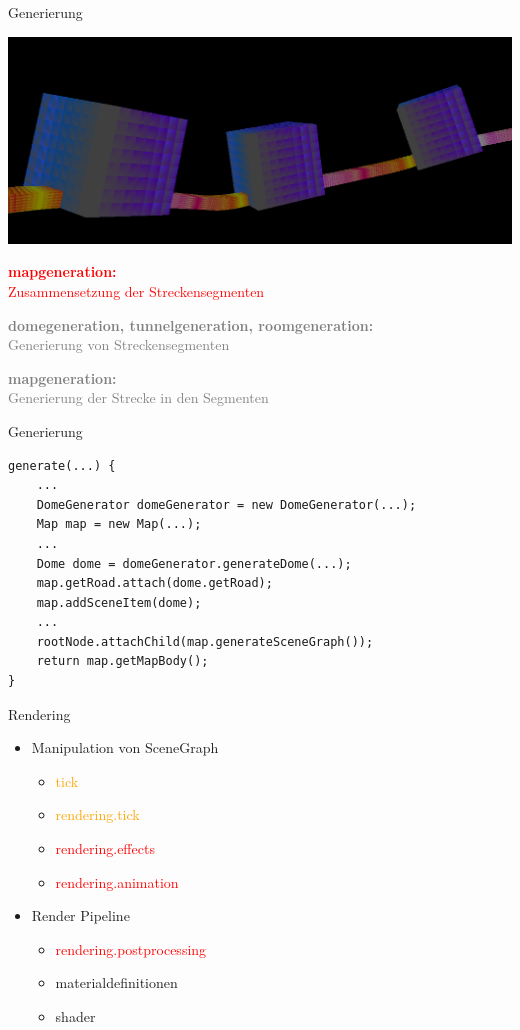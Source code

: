 \documentclass[10pt]{beamer}
\begin{document}
\begin{frame}[fragile]{Generierung}
    
    \includegraphics[width=.5\linewidth]{./Bilder/mapgenerationPrototype.PNG}
    \begin{itemize}
        \item \textcolor{red}{\textbf{mapgeneration:}\\Zusammensetzung der Streckensegmenten}\par
        \textcolor{gray}{\item \textbf{domegeneration, tunnelgeneration, roomgeneration:}\\Generierung von Streckensegmenten}\par
        \textcolor{gray}{\item \textbf{mapgeneration:}\\Generierung der Strecke in den Segmenten}
    \end{itemize}
\end{frame}



\begin{frame}[fragile]{Generierung}
    \begin{lstlisting}
generate(...) {
    ...
    DomeGenerator domeGenerator = new DomeGenerator(...);
    Map map = new Map(...);
    ...
    Dome dome = domeGenerator.generateDome(...);
    map.getRoad.attach(dome.getRoad);
    map.addSceneItem(dome);
    ...
    rootNode.attachChild(map.generateSceneGraph());
    return map.getMapBody();
}
    \end{lstlisting}
\end{frame}




\begin{frame}[fragile]{Rendering}
    \begin{itemize}
        \item Manipulation von SceneGraph
        \begin{itemize}
            \item \textcolor{orange}{tick}
            \item \textcolor{orange}{rendering.tick}
            \item \textcolor{red}{rendering.effects}
            \item \textcolor{red}{rendering.animation}
        \end{itemize}
        \item Render Pipeline
        \begin{itemize}
            \item \textcolor{red}{rendering.postprocessing}
            \item materialdefinitionen
            \item shader
        \end{itemize}
    \end{itemize}
\end{frame}
\end{document}
